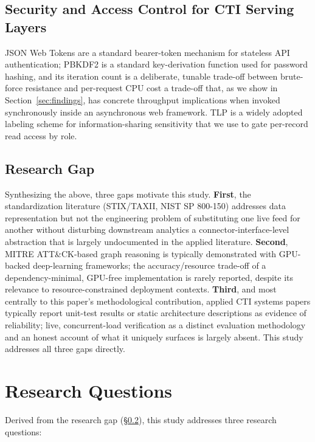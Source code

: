 \documentclass[conference]{IEEEtran}
\begin{document}
\subsection{Security and Access Control for CTI Serving Layers}
JSON Web Tokens \cite{rfc7519} are a standard bearer-token mechanism for stateless API authentication; PBKDF2 \cite{rfc8018} is a standard key-derivation function used for password hashing, and its iteration count is a deliberate, tunable trade-off between brute-force resistance and per-request CPU cost \textemdash{} a trade-off that, as we show in Section~\ref{sec:findings}, has concrete throughput implications when invoked synchronously inside an asynchronous web framework. TLP \cite{first_tlp} is a widely adopted labeling scheme for information-sharing sensitivity that we use to gate per-record read access by role.

\subsection{Research Gap}
\label{sec:gap}
Synthesizing the above, three gaps motivate this study. \textbf{First}, the standardization literature (STIX/TAXII, NIST SP 800-150) addresses data representation but not the engineering problem of substituting one live feed for another without disturbing downstream analytics \textemdash{} a connector-interface-level abstraction that is largely undocumented in the applied literature. \textbf{Second}, MITRE ATT\&CK-based graph reasoning is typically demonstrated with GPU-backed deep-learning frameworks; the accuracy/resource trade-off of a dependency-minimal, GPU-free implementation is rarely reported, despite its relevance to resource-constrained deployment contexts. \textbf{Third}, and most centrally to this paper's methodological contribution, applied CTI systems papers typically report unit-test results or static architecture descriptions as evidence of reliability; live, concurrent-load verification as a distinct evaluation methodology \textemdash{} and an honest account of what it uniquely surfaces \textemdash{} is largely absent. This study addresses all three gaps directly.

\section{Research Questions}
\label{sec:questions}
Derived from the research gap (\S\ref{sec:gap}), this study addresses three research questions:
\end{document}

